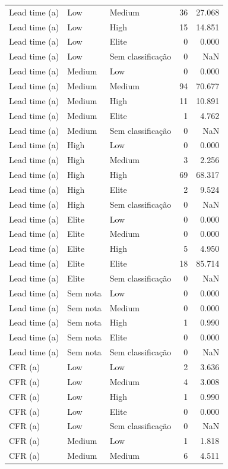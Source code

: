 \begin{tabular}{lllrr}
Lead time (a) & Low & Medium & 36 & 27.068 \\
Lead time (a) & Low & High & 15 & 14.851 \\
Lead time (a) & Low & Elite & 0 & 0.000 \\
Lead time (a) & Low & Sem classificação & 0 & NaN \\
Lead time (a) & Medium & Low & 0 & 0.000 \\
Lead time (a) & Medium & Medium & 94 & 70.677 \\
Lead time (a) & Medium & High & 11 & 10.891 \\
Lead time (a) & Medium & Elite & 1 & 4.762 \\
Lead time (a) & Medium & Sem classificação & 0 & NaN \\
Lead time (a) & High & Low & 0 & 0.000 \\
Lead time (a) & High & Medium & 3 & 2.256 \\
Lead time (a) & High & High & 69 & 68.317 \\
Lead time (a) & High & Elite & 2 & 9.524 \\
Lead time (a) & High & Sem classificação & 0 & NaN \\
Lead time (a) & Elite & Low & 0 & 0.000 \\
Lead time (a) & Elite & Medium & 0 & 0.000 \\
Lead time (a) & Elite & High & 5 & 4.950 \\
Lead time (a) & Elite & Elite & 18 & 85.714 \\
Lead time (a) & Elite & Sem classificação & 0 & NaN \\
Lead time (a) & Sem nota & Low & 0 & 0.000 \\
Lead time (a) & Sem nota & Medium & 0 & 0.000 \\
Lead time (a) & Sem nota & High & 1 & 0.990 \\
Lead time (a) & Sem nota & Elite & 0 & 0.000 \\
Lead time (a) & Sem nota & Sem classificação & 0 & NaN \\
CFR (a) & Low & Low & 2 & 3.636 \\
CFR (a) & Low & Medium & 4 & 3.008 \\
CFR (a) & Low & High & 1 & 0.990 \\
CFR (a) & Low & Elite & 0 & 0.000 \\
CFR (a) & Low & Sem classificação & 0 & NaN \\
CFR (a) & Medium & Low & 1 & 1.818 \\
CFR (a) & Medium & Medium & 6 & 4.511 \\

\end{tabular}
